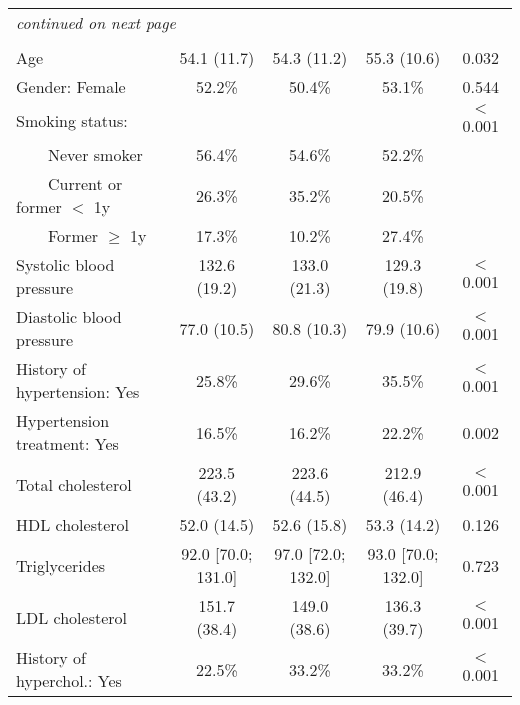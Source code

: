 \begin{longtable}{lcccc}
    \hline
    \hline  
    \endhead   
    \hline
    \multicolumn{5}{l}{\textit{continued on next page}} \\ 
    \endfoot   
    \multicolumn{5}{l}{}  \\ 
    \endlastfoot 
    Age &     54.1 (11.7)      &     54.3 (11.2)      &     55.3 (10.6)      &        0.032        \\ 
Gender: Female &        52.2\%         &        50.4\%         &        53.1\%         &        0.544        \\ 
Smoking status: &                      &                      &                      &        $<$0.001       \\ 
$\qquad$Never smoker &        56.4\%         &        54.6\%         &        52.2\%         &                     \\ 
$\qquad$Current or former $<$ 1y &        26.3\%         &        35.2\%         &        20.5\%         &                     \\ 
$\qquad$Former $\geq$ 1y &        17.3\%         &        10.2\%         &        27.4\%         &                     \\ 
Systolic blood pressure &     132.6 (19.2)     &     133.0 (21.3)     &     129.3 (19.8)     &        $<$0.001       \\ 
Diastolic blood pressure &     77.0 (10.5)      &     80.8 (10.3)      &     79.9 (10.6)      &        $<$0.001       \\ 
History of hypertension: Yes &        25.8\%         &        29.6\%         &        35.5\%         &        $<$0.001       \\ 
Hypertension treatment: Yes &        16.5\%         &        16.2\%         &        22.2\%         &        0.002        \\ 
Total cholesterol &     223.5 (43.2)     &     223.6 (44.5)     &     212.9 (46.4)     &        $<$0.001       \\ 
HDL cholesterol &     52.0 (14.5)      &     52.6 (15.8)      &     53.3 (14.2)      &        0.126        \\ 
Triglycerides &  92.0 [70.0; 131.0]  &  97.0 [72.0; 132.0]  &  93.0 [70.0; 132.0]  &        0.723        \\ 
LDL cholesterol &     151.7 (38.4)     &     149.0 (38.6)     &     136.3 (39.7)     &        $<$0.001       \\ 
History of hyperchol.: Yes &        22.5\%         &        33.2\%         &        33.2\%         &        $<$0.001       \\ 

\end{longtable}
